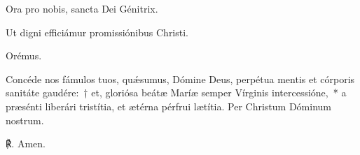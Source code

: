 \noindent \vv Ora pro nobis, sancta Dei Génitrix.

\noindent \rr Ut digni efficiámur promissiónibus Christi.

%
%

Orémus.

\noindent  Concéde nos fámulos tuos, quǽsumus, Dómine Deus, perpétua mentis et córporis sanitáte gaudére:~†  et, gloriósa beátæ Maríæ semper Vírginis intercessióne,~* a præsénti liberári tristítia, et ætérna pérfrui lætítia. Per Christum Dóminum nostrum.

℟. Amen.